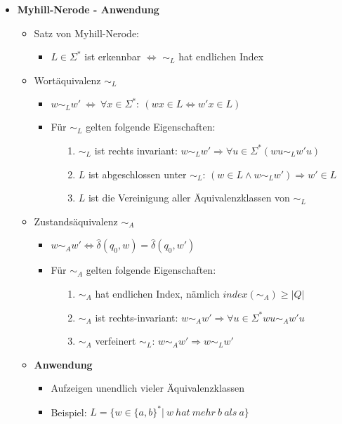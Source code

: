 \begin{itemize}
\item {\large \textbf{Myhill-Nerode - Anwendung}}
	\begin{itemize}
	\item Satz von Myhill-Nerode:
		\begin{itemize}
		\item $L \in \Sigma^*$ ist erkennbar $\Leftrightarrow$ $\sim_L$ hat endlichen Index
		\end{itemize}
	\item Wortäquivalenz $\sim_L$
		\begin{itemize}
		\item $w \sim_L w'~\Leftrightarrow~ \forall x \in \Sigma^*:~(wx \in L \Leftrightarrow w'x \in L)$
		\item Für $\sim_L$ gelten folgende Eigenschaften:
			\begin{itemize}
			\item[1.] $\sim_L$ ist rechts invariant: $w \sim_L w' \Rightarrow \forall u \in \Sigma^* (wu \sim_L w'u)$
			\item[2.] $L$ ist abgeschlossen unter $\sim_L$: $(w\in L \land w \sim_L w') \Rightarrow w' \in L$
			\item[3.] $L$ ist die Vereinigung aller Äquivalenzklassen von $\sim_L$
			\end{itemize}
		\end{itemize}
	\item Zustandsäquivalenz $\sim_A$
		\begin{itemize}
		\item $w \sim_A w' \Leftrightarrow \hat{\delta}(q_0,w) = \hat{\delta}(q_0,w')$
		\item Für $\sim_A$ gelten folgende Eigenschaften:
			\begin{itemize}
			\item[1.]$\sim_A$ hat endlichen Index, nämlich $index(\sim_A) \geq |Q|$
			\item[2.]$\sim_A$ ist rechts-invariant: $w \sim_A w' \Rightarrow \forall u \in \Sigma^* wu \sim_A w'u$
			\item[3.]$\sim_A$ verfeinert $\sim_L$: $w\sim_A w' \Rightarrow w \sim_L w'$
			\end{itemize}
		\end{itemize}
	\item[]
	\item \textbf{Anwendung}
		\begin{itemize}
		\item Aufzeigen unendlich vieler Äquivalenzklassen 
		\item Beispiel: $L=\{w \in \{a,b\}^* |~w~hat~mehr~b~als~a\}$

\end{itemize}
\end{itemize}
\end{itemize}
